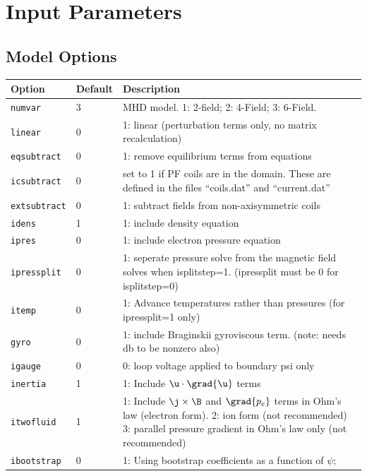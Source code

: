 \section{Input Parameters}
\label{sec:input_parameters}
\subsection{Model Options}

\begin{tabular}{llp{4in}}
  \textbf{Option}&\textbf{Default}&\textbf{Description}\\
  \hline
  \texttt{numvar} & 3   & MHD model. 1: 2-field;  2: 4-Field;  3: 6-Field.\\
  \texttt{linear} & 0   & 1: linear (perturbation terms only, no matrix
  recalculation)\\
  \texttt{eqsubtract}& 0& 1: remove equilibrium terms from equations\\
  \texttt{icsubtract}& 0& set to 1 if PF coils are in the domain.  These are
  defined in the files ``coils.dat'' and ``current.dat''\\
  \texttt{extsubtract} & 0 & 1: subtract fields from non-axisymmetric coils \\
  \texttt{idens}  & 1   & 1: include density equation\\
  \texttt{ipres}  & 0   & 1: include electron pressure equation\\
  \texttt{ipressplit} & 0 & 1: seperate pressure solve from the magnetic field
  solves when isplitstep=1.  (ipressplit must be 0 for isplitstep=0) \\
  \texttt{itemp} & 0 & 1: Advance temperatures rather than pressures (for ipressplit=1 only) \\
  \texttt{gyro}   & 0   & 1: include Braginskii gyroviscous term.  (note:
  needs db to be nonzero also) \\
  \texttt{igauge} & 0   & 0: loop voltage applied to boundary psi only \\
  \texttt{inertia} & 1  & 1: Include $\u \cdot \grad{\u}$ terms\\
  \texttt{itwofluid}& 1 & 1: Include $\j\times\B$ and
  $\grad{p_e}$ terms in Ohm's law (electron form).  2: ion form (not
  recommended)  3: parallel pressure gradient in Ohm's law only
  (not recommended) \\
  \texttt{ibootstrap} & 0 & 1: Using bootstrap coefficients as a function of $\psi$; \\

\end{tabular}
